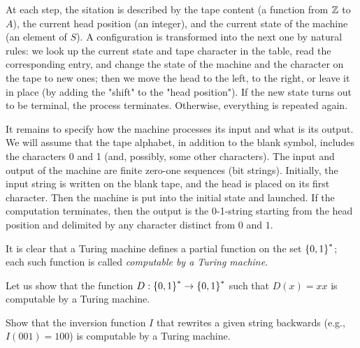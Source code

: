 At each step, the sitation is described by the tape content (a function from
${\mathbb{Z}}$ to $A$), the current head position (an integer), and the current state of
the machine (an element of $S$). A configuration is transformed into the next
one by natural rules: we look up the current state and tape character in the
table, read the corresponding entry, and change the state of the machine and the
character on the tape to new ones; then we move the head to the left, to the
right, or leave it in place (by adding the "shift" to the "head position"). If
the new state turns out to be terminal, the process terminates. Otherwise,
everything is repeated again.

It remains to specify how the machine processes its input and what is its
output. We will assume that the tape alphabet, in addition to the blank symbol,
includes the characters 0 and 1 (and, possibly, some other characters). The
input and output of the machine are finite zero-one sequences (bit strings).
Initially, the input string is written on the blank tape, and the head is placed
on its first character. Then the machine is put into the initial state and
launched. If the computation terminates, then the output is the 0-1-string
starting from the head position and delimited by any character distinct from $0$
and $1$.

It is clear that a Turing machine defines a partial function on the set 
$\set{0, 1}^*$; each such function is called \emph{computable by a Turing
machine}.

Let us show that the function $D : \set{0, 1}^* \to \set{0, 1}^*$ such that
$D(x) = xx$ is computable by a Turing machine.

\begin{exercise}
  Show that the inversion function $I$ that rewrites a given string backwards
  (e.g., $I(001) = 100$) is computable by a Turing machine.
\end{exercise}

